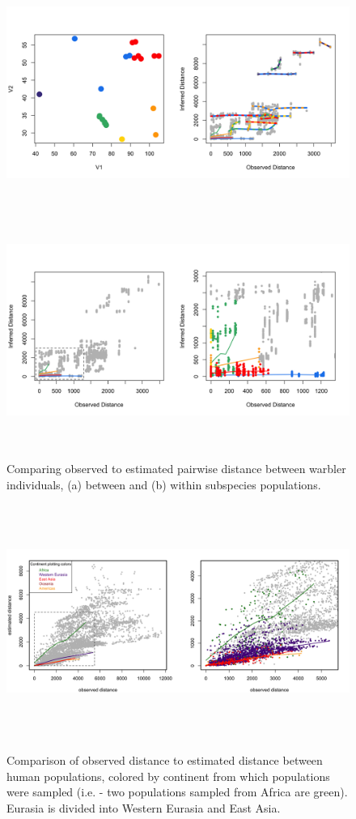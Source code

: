 \documentclass[12pt]{article}
\begin{document}
\begin{figure}
	\centering
			{\includegraphics[width=6in,height=3in]{figs/warb_ind_dist_compare_allpairs.png}}
			{\includegraphics[width=6in,height=3in]{figs/warb_ind_dist_compare.png}}
	\caption{Comparing observed to estimated pairwise distance between warbler individuals, (a) between and (b) within subspecies populations.}\label{sfig:warb_ind_distcomp}
\end{figure}

\begin{figure}
	\centering
		{\includegraphics[width=6in,height=3in]{figs/globe_NoAd_dist_compare.png}}
	\caption{Comparison of observed distance to estimated distance between human populations, colored by continent from which populations were sampled (i.e. - two populations sampled from Africa are green).  Eurasia is divided into Western Eurasia and East Asia.}
\label{sfig:globe_noad_distcomp}
\end{figure}
\end{document}
